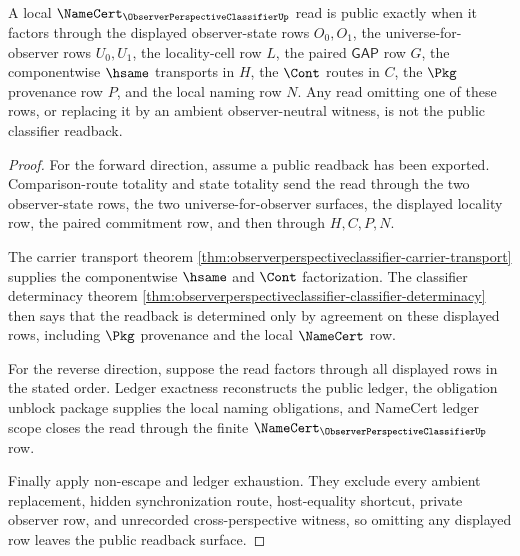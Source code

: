 \begin{theorem}
\label{thm:observer-perspective-classifier-public-readback-criterion}
A local $\NameCert_{\ObserverPerspectiveClassifierUp}$ read is public exactly when it factors through the displayed observer-state rows $O_0,O_1$, the universe-for-observer rows $U_0,U_1$, the locality-cell row $L$, the paired $\mathsf{GAP}$ row $G$, the componentwise $\hsame$ transports in $H$, the $\Cont$ routes in $C$, the $\Pkg$ provenance row $P$, and the local naming row $N$. Any read omitting one of these rows, or replacing it by an ambient observer-neutral witness, is not the public classifier readback.
\end{theorem}
\begin{proof}
For the forward direction, assume a public readback has been exported. Comparison-route totality and state totality send the read through the two observer-state rows, the two universe-for-observer surfaces, the displayed locality row, the paired commitment row, and then through $H,C,P,N$.

The carrier transport theorem \autoref{thm:observerperspectiveclassifier-carrier-transport} supplies the componentwise $\hsame$ and $\Cont$ factorization. The classifier determinacy theorem \autoref{thm:observerperspectiveclassifier-classifier-determinacy} then says that the readback is determined only by agreement on these displayed rows, including $\Pkg$ provenance and the local $\NameCert$ row.

For the reverse direction, suppose the read factors through all displayed rows in the stated order. Ledger exactness reconstructs the public ledger, the obligation unblock package supplies the local naming obligations, and NameCert ledger scope closes the read through the finite $\NameCert_{\ObserverPerspectiveClassifierUp}$ row.

Finally apply non-escape and ledger exhaustion. They exclude every ambient replacement, hidden synchronization route, host-equality shortcut, private observer row, and unrecorded cross-perspective witness, so omitting any displayed row leaves the public readback surface.
\end{proof}

